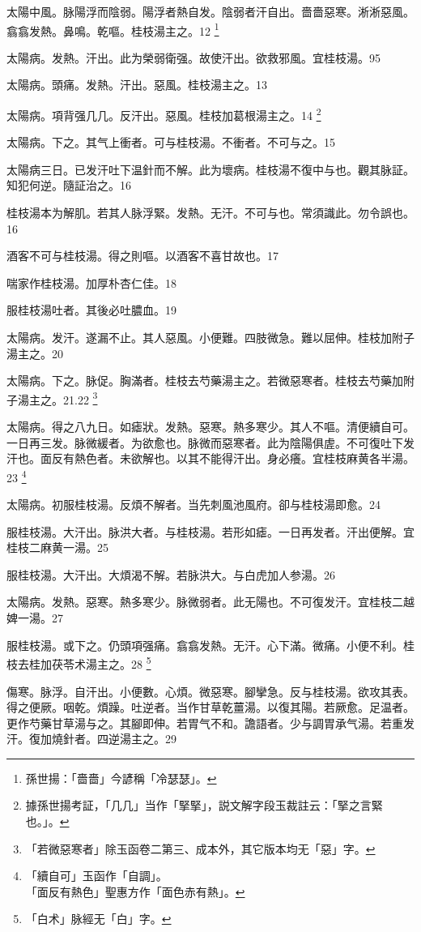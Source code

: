 太陽中風。{\khaaitp 脉}陽浮而陰弱。陽浮者熱自发。陰弱者汗自出。嗇嗇惡寒。淅淅惡風。翕翕发熱。鼻鳴。乾嘔。桂枝湯主之。12
	\footnote{孫世揚：「嗇嗇」今諺稱「冷瑟瑟」。}

太陽病。发熱。汗出。此为榮弱衛强。故使汗出。欲救邪風。宜桂枝湯。95

太陽病。頭痛。发熱。汗出。惡風。桂枝湯主之。13

太陽病。項背强几几。反汗出。惡風。桂枝{\khaaitp 加葛根}湯主之。14
	\footnote{據孫世揚考証，「几几」当作「掔掔」，説文解字段玉裁註云：「掔之言緊也。」。}

太陽病。下之。其气上衝者。可与桂枝湯。不衝者。不可与之。15

太陽病三日。已发汗吐下温針而不解。此为壞病。桂枝湯不復中与也。觀其脉証。知犯何逆。隨証治之。16

桂枝湯本为解肌。若其人脉浮緊。发熱。无汗。不可与也。常須識此。勿令誤也。16

酒客不可与桂枝湯。得之則嘔。以酒客不喜甘故也。17

喘家作桂枝湯。加厚朴杏仁佳。18

服桂枝湯吐者。其後必吐膿血。19

太陽病。发汗。遂漏不止。其人惡風。小便難。四肢微急。難以屈伸。桂枝加附子湯主之。20

太陽病。下之。脉促。胸滿者。桂枝去芍藥湯主之。若微{\khaaitp 惡}寒者。桂枝去芍藥加附子湯主之。21.22
	\footnote{「若微惡寒者」除玉函卷二第三、成本外，其它版本均无「惡」字。}


太陽病。得之八九日。如瘧狀。发熱。惡寒。熱多寒少。其人不嘔。清便續自可。一日再三发。脉微緩者。为欲愈也。脉微而惡寒者。此为陰陽俱虗。不可復{\khaaitp 吐下}发汗也。面反有熱色者。未欲解也。以其不能得汗出。身必癢。宜桂枝麻黄各半湯。23
	\footnote{「續自可」玉函作「自調」。\\「面反有熱色」聖惠方作「面色赤有熱」。}

太陽病。初服桂枝湯。反煩不解者。当先刺風池風府。卻与桂枝湯即愈。24

服桂枝湯。大汗出。脉洪大者。与桂枝湯。若形如瘧。一日再发者。汗出便解。宜桂枝二麻黄一湯。25

服桂枝湯。大汗出。大煩渴不解。若脉洪大。与白虎{\khaaitp 加人参}湯。26

太陽病。发熱。惡寒。熱多寒少。脉微弱者。此无陽也。不可{\khaaitp 復}发汗。{\khaaitp 宜桂枝二越婢一湯。}27

服桂枝湯。{\khaaitp 或}下之。仍頭項强痛。翕翕发熱。无汗。心下滿。微痛。小便不利。桂枝去桂加茯苓术湯主之。28
	\footnote{「白术」脉經无「白」字。}

傷寒。脉浮。自汗出。小便數。心煩。微惡寒。腳攣急。反与桂枝湯。欲攻其表。得之便厥。咽乾。煩躁。吐逆者。当作甘草乾薑湯。以復其陽。若厥愈。足温者。更作芍藥甘草湯与之。其腳即伸。若胃气不和。譫語者。少与{\khaaitp 調胃}承气湯。若重发汗。復加燒針者。四逆湯主之。29

